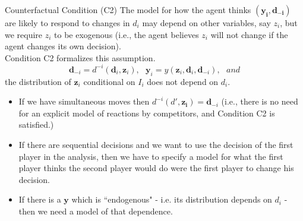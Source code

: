 \documentclass[xcolor=pdftex,dvipsnames,table,mathserif]{beamer}
\begin{document}
\begin{frame}{Counterfactual Condition (C2)}
\footnotesize
The model for how the agent thinks $(\mathbf{y_i, d_{-i}})$ are likely to
respond to changes in $d_i$ may depend on other variables, say $z_i$, but we require $z_i$ to be exogenous (i.e., the agent believes $z_i$ will not change if the agent changes its own
decision). \\ \vspace{0.2in}
\noindent Condition C2 formalizes this assumption.
\begin{equation*}
\mathbf{d}_{-i}=d^{-i}(\mathbf{d}_{i},\mathbf{z}_{i}),\text{ \ }\mathbf{y}%
_{i}=y(\mathbf{z}_{i},\mathbf{d}_{i},\mathbf{d}_{-i}),\text{ }and
\end{equation*}
the distribution of $\mathbf{z}_{i}$ conditional on $\mathit{I}_{i}$ does
not depend on $d_{i}$.
\begin{itemize}
\item If we have simultaneous moves then $d^{-i}(d',\mathbf{z_i}) = \mathbf{d}_{-i}$ (i.e., there is no need for an explicit model of reactions by competitors, and Condition C2 is satisfied.)
\item If there are sequential decisions and we want to use the decision of the first player in the analysis,
then we have to specify a model for what the first player
thinks the second player would do were the first player to
change his decision.
\item If there is a $\mathbf{y}$ which is ``endogenous" - i.e. its distribution depends on $d_{i}$ - then we
need a model of that dependence.
\end{itemize}
\end{frame}
\end{document}
